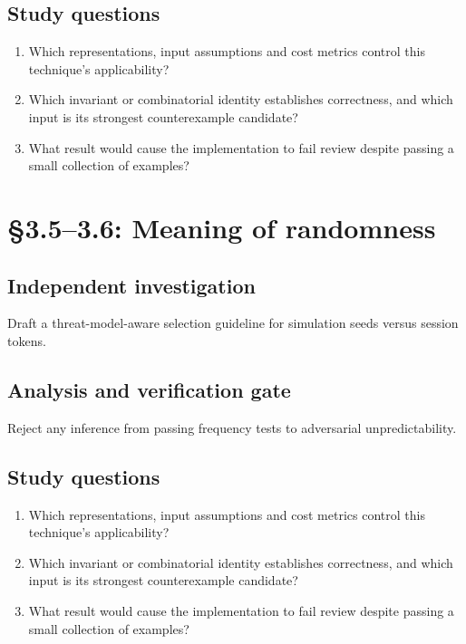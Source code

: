 \documentclass[11pt,letterpaper]{article}
\begin{document}
\subsection{Study questions}
\begin{enumerate}
\item Which representations, input assumptions and cost metrics control this technique's applicability?
\item Which invariant or combinatorial identity establishes correctness, and which input is its strongest counterexample candidate?
\item What result would cause the implementation to fail review despite passing a small collection of examples?
\end{enumerate}

\section{\S 3.5--3.6: Meaning of randomness}
\subsection{Independent investigation}
Draft a threat-model-aware selection guideline for simulation seeds versus session tokens.
\subsection{Analysis and verification gate}
Reject any inference from passing frequency tests to adversarial unpredictability.
\subsection{Study questions}
\begin{enumerate}
\item Which representations, input assumptions and cost metrics control this technique's applicability?
\item Which invariant or combinatorial identity establishes correctness, and which input is its strongest counterexample candidate?
\item What result would cause the implementation to fail review despite passing a small collection of examples?
\end{enumerate}
\end{document}
